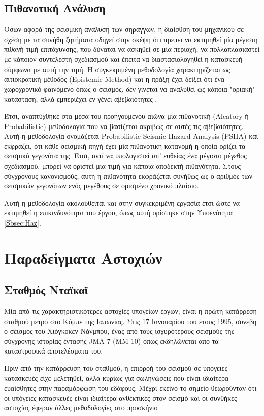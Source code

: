 \subsection{Πιθανοτική Ανάλυση}

Όσων αφορά της σεισμική ανάλυση των σηράγγων, η διαίσθση του μηχανικού σε σχέση με τα συνήθη ζητήματα οδηγεί στην σκέψη ότι  πρεπει να εκτιμηθεί μία μέγιστη πιθανή  τιμή επιτάχυνσης, που δύναται να ασκηθεί σε μία περιοχή, να πολλαπλασιαστεί με κάποιον συντελεστή σχεδιασμού και έπειτα να διαστασιολογηθεί η κατασκευή σύμφωνα με αυτή την τιμή. Η συγκεκριμένη μεθοδολογία χαρακτηρίζεται ως αιτιοκρατική μέθοδος (Epistemic Method) και η πράξη έχει δείξει ότι ένα χωροχρονικό φαινόμενο όπως ο σεισμός, δεν γίνεται να αναλυθεί ως κάποια "οριακή" κατάσταση, αλλά εμπεριέχει εν γένει αβεβαιότητες \parencite{Pitilakis}.

Έτσι, αναπτύχθηκε στα μέσα του προηγούμενου αιώνα μία πιθανοτική (Aleatory ή Probabilistic) μεθοδολογία που να βασίζεται ακριβώς σε αυτές τις αβεβαιότητες. Αυτή η μεθοδολογία ονομάζεται Probabilistic Seismic Hazard Analysis (PSHA) και εκφράζει, ότι κάθε σεισμική πηγή έχει μία πιθανοτική κατανομή η οποία ορίζει τα σεισμικά γεγονότα της. Έτσι, αντί να υπολογιστεί απ' ευθείας ένα μέγιστο μέγεθος σχεδιασμού, μπορεί να οριστεί μία τιμή για κάποια αποδεκτή πιθανότητα. Στους σύγχρονους κανονισμούς, αυτή η πιθανότητα εκφράζεται συνήθως ως ο αριθμός των σεισμικών γεγονότων ενός μεγέθους σε ορισμένο χρονικό πλαίσιο.

Αυτή η μεθοδολογία ακολουθείται και στην συγκεκριμένη εργασία έτσι ώστε να εκτιμηθεί η επικινδυνότητα του έργου, όπως αυτή ορίστηκε στην Υποενότητα \ref{Sbsec:Haz}.

\section{Παραδείγματα Αστοχιών}
\subsection{Σταθμός Νταϊκαϊ}
Μία από τις χαρακτηριστικότερες αστοχίες υπογείων έργων, είναι η πρώτη κατάρρεση σταθμού μετρό στο Κόμπε της Ιαπωνίας. Στις 17 Ιανουαρίου του έτους 1995, συνέβη ο σεισμός του Χιόγκοκεν-Νάνμπου, ένας από τους ισχυρότερους σεισμούς της σύγχρονης ιστορίας έντασης JMA 7 (MM 10) όπως εκδηλώνεται από τα καταστροφικά αποτελέσματα του.

Πριν από την κατάρρευση του σταθμού, η επιρροή του σεισμού σε υπόγειες κατασκευές είχε μελετηθεί, αλλά κυρίως για σωληνώσεις που είναι ιδιαίτερα ευαίσθητες στην παραμόρφωση του εδάφους. Μέχρι εκείνο το σημείο θεωρούνταν ότι οι υπόγειες κατασκευές είναι ιδιαίτερα ανθεκτικές στον σεισμό και οι συνθήκες αστοχίας έφεραν άλλες μεθοδολογίες στο προσκήνιο

